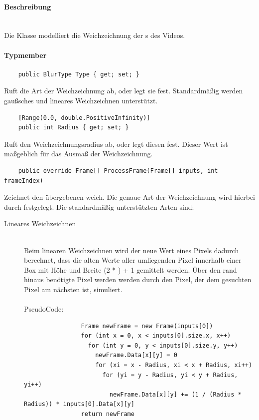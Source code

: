\paragraph{Beschreibung}~\\
Die Klasse  modelliert die Weichzeichnung der s des Videos.

\paragraph{Typmember}
\begin{itemize}

	\begin{verbatim}
	public BlurType Type { get; set; }
	\end{verbatim}
	Ruft die Art der Weichzeichnung ab, oder legt sie fest. Standardmäßig werden gaußsches und lineares Weichzeichnen unterstützt.
	
	\begin{verbatim}
	[Range(0.0, double.PositiveInfinity)]
	public int Radius { get; set; }
	\end{verbatim}
	Ruft den Weichzeichnungsradius ab, oder legt diesen fest. Dieser Wert ist maßgeblich für das Ausmaß der Weichzeichnung.

	\begin{verbatim}
	public override Frame[] ProcessFrame(Frame[] inputs, int frameIndex)
	\end{verbatim}
	Zeichnet den übergebenen  weich. Die genaue Art der Weichzeichnung wird hierbei durch  festgelegt. Die standardmäßig unterstützten Arten sind:
	\begin{description}
		\item[Lineares Weichzeichnen]~\\
			Beim linearen Weichzeichnen wird der neue Wert eines Pixels dadurch berechnet, dass die alten Werte aller umliegenden Pixel innerhalb einer Box mit Höhe und Breite (2 * ) + 1 gemittelt werden. Über den rand hinaus benötigte Pixel werden werden durch den Pixel, der dem gesuchten Pixel am nächsten ist, simuliert. ~\\~\\
			PseudoCode:
			\begin{verbatim}
				Frame newFrame = new Frame(inputs[0])
				for (int x = 0, x < inputs[0].size.x, x++)
				  for (int y = 0, y < inputs[0].size.y, y++)
				    newFrame.Data[x][y] = 0
				    for (xi = x - Radius, xi < x + Radius, xi++)
				      for (yi = y - Radius, yi < y + Radius, yi++)
				        newFrame.Data[x][y] += (1 / (Radius * Radius)) * inputs[0].Data[x][y]
				return newFrame
				

\end{verbatim}
\end{description}
\end{itemize}
